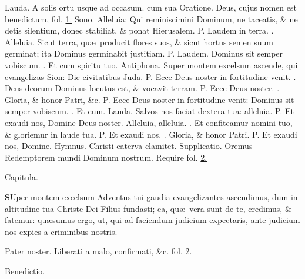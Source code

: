 \documentclass[letter,11pt]{book}
\makeatletter
\DeclareRobustCommand{\Vbar}{\vers@resp{-0.1em}{V}}
\DeclareRobustCommand{\Rbar}{\vers@resp{0pt}{R}}
\newcommand{\vers@resp@sym}{\raisebox{0.2ex}{\rotatebox[origin=c]{-20}{$\m@th\rceil$}}}
\newcommand{\vers@resp}[2]{%
  {\ooalign{\hidewidth\kern#1\vers@resp@sym\hidewidth\cr#2\cr}}%
}%
\def\P{\color{Red} P. \color{black}}
\def\V{\color{Red} \Vbar . \color{black}}
\def\R{\color{Red} \Rbar . \color{black}}
\makeatother
\begin{document}
\begin{multicols}{2}
\par \noindent \color{Red} Lauda. \color{black} A solis ortu usque ad occasum. \color{Red} cum
sua Oratione. \color{black} Deus, cujus nomen est benedictum, \color{Red} fol. \color{black} \hyperlink{page.1}{1.}
\newline \color{Red} Sono. \color{black} Alleluia: Qui reminiscimini Dominum, ne taceatis, \& ne detis silentium, donec stabiliat, \& ponat Hierusalem. \P Laudem in terra. \V Alleluia. Sicut terra, qu\ae \ producit flores suos, \& sicut hortus semen suum germinat; ita Dominus germinabit justitiam. \P Laudem. Dominus sit semper vobiscum. \R Et cum spiritu tuo.
\newline \color{Red} Antiphona. \color{black} Super montem excelsum ascende, qui evangelizas Sion: Dic civitatibus Juda. \P Ecce Deus noster in fortitudine venit. \V Deus deorum Dominus locutus est, \& vocavit terram. \P Ecce Deus noster. \V Gloria, \& honor Patri, \&c. \P Ecce Deus noster in fortitudine venit: Dominus sit semper vobiscum. \R Et cum.
\newline \color{Red} Lauda. \color{black} Salvos nos faciat dextera tua: alleluia. \P Et exaudi nos, Domine Deus noster. Alleluia, alleluia. \V Et confiteamur nomini tuo, \& gloriemur in laude tua. \P Et exaudi nos. \V Gloria, \& honor Patri. \P Et exaudi nos, Domine.
\newline \color{Red} Hymnus. \color{black} Christi caterva clamitet. \color{Red} Supplicatio. \color{black} Oremus Redemptorem mundi Dominum nostrum. \color{Red} Require fol. \color{black} \hyperlink{Supplicatio}{2.}
\vspace{-.5em} \begin{center} \color{Red} Capitula. \end{center} \vspace{-.5em}
\lettrine[lines=2]{\bfseries \color{Red} S}{}Uper montem excelsum Adventus tui gaudia evangelizantes ascendimus, dum in altitudine tua Christe Dei Filius fundasti; ea, qu\ae \ vera sunt de te, credimus, \& fatemur: qu\ae sumus ergo, ut, qui ad faciendum judicium expectaris, ante judicium nos expies a criminibus nostris.
\par Pater noster. Liberati a malo, confirmati, \&c. \color{Red} fol. \color{black} \hyperlink{page.2}{2.}
\vspace{-.5em} \begin{center} \color{Red} Benedictio. \end{center} \vspace{-.5em}

\end{multicols}
\end{document}

